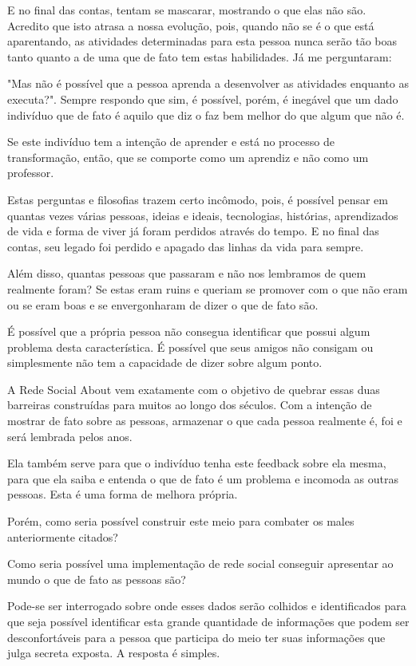 E no final das contas, tentam se mascarar, mostrando o que elas não são.
Acredito que isto atrasa a nossa evolução, pois, quando não se é o que está
aparentando, as atividades determinadas para esta pessoa nunca serão tão
boas tanto quanto a de uma que de fato tem estas habilidades. Já me perguntaram: 

"Mas não é possível que a pessoa aprenda a desenvolver as atividades enquanto
as executa?". Sempre respondo que sim, é possível, porém, é inegável que um
dado indivíduo que de fato é aquilo que diz o faz bem melhor do que algum
que não é.

Se este indivíduo tem a intenção de aprender e está no processo de transformação,
então, que se comporte como um aprendiz e não como um professor.

Estas perguntas e filosofias trazem certo incômodo, pois, é possível pensar em quantas 
vezes várias
pessoas, ideias e ideais, tecnologias, histórias, aprendizados de vida e forma de
viver já foram perdidos através do tempo. E no final das contas, seu legado foi
perdido e apagado das linhas da vida para sempre.

Além disso, quantas pessoas que passaram e não nos lembramos de quem realmente foram?
Se estas eram ruins e queriam se promover com o que não eram 
ou se eram boas e se envergonharam de dizer o que de fato são.

É possível que a própria pessoa não consegua identificar que possui algum problema
desta característica. É possível que seus amigos não
consigam ou simplesmente não tem a capacidade de dizer sobre algum ponto.

A Rede Social About vem exatamente com o objetivo de quebrar essas duas barreiras construídas
para muitos ao longo dos séculos. Com a intenção de mostrar de fato sobre as pessoas,
armazenar o que cada pessoa realmente é, foi e será lembrada pelos anos.

Ela também serve para que o indivíduo tenha este feedback sobre ela mesma, para que ela
saiba e entenda o que de fato é um problema e incomoda as outras pessoas. Esta é uma forma
de melhora própria. 

Porém, como seria possível construir este meio para combater os males anteriormente citados?

Como seria possível uma implementação de rede social conseguir apresentar ao mundo o que
de fato as pessoas são?

Pode-se ser interrogado sobre onde esses dados serão colhidos e identificados para que seja
possível identificar esta grande quantidade de informações que podem ser desconfortáveis
para a pessoa que participa do meio ter suas informações que julga secreta exposta. A resposta
é simples.

